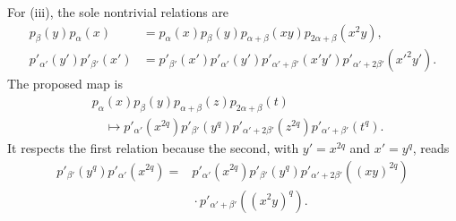 For (iii), the sole nontrivial relations are
\[
\begin{aligned}
 p_\beta(y)p_\alpha(x)
  &=p_\alpha(x)p_\beta(y)p_{\alpha+\beta}(xy)
    p_{2\alpha+\beta}(x^2y),\\
 p'_{\alpha'}(y')p'_{\beta'}(x')
  &=p'_{\beta'}(x')p'_{\alpha'}(y')
    p'_{\alpha'+\beta'}(x'y')
    p'_{\alpha'+2\beta'}(x'^2y').
\end{aligned}
\]
The proposed map is
\[
\begin{aligned}
 &p_\alpha(x)p_\beta(y)p_{\alpha+\beta}(z)p_{2\alpha+\beta}(t)\\
 &\quad\longmapsto
 p'_{\alpha'}(x^{2q})p'_{\beta'}(y^q)
 p'_{\alpha'+2\beta'}(z^{2q})p'_{\alpha'+\beta'}(t^q).
\end{aligned}
\]
It respects the first relation because the second, with
\(y'=x^{2q}\) and \(x'=y^q\), reads
\[
\begin{aligned}
 p'_{\beta'}(y^q)p'_{\alpha'}(x^{2q})
  ={}&p'_{\alpha'}(x^{2q})p'_{\beta'}(y^q)
   p'_{\alpha'+2\beta'}((xy)^{2q})\\
   &{}\cdot p'_{\alpha'+\beta'}((x^2y)^q).
\end{aligned}
\]

